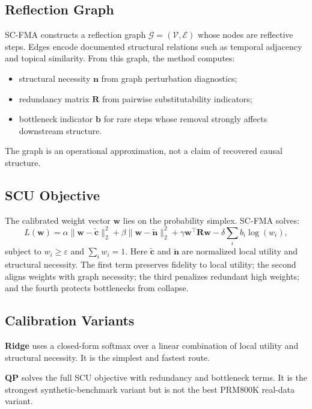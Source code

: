 \documentclass[a4paper,fleqn]{cas-sc}
\begin{document}
\subsection{Reflection Graph}

SC-FMA constructs a reflection graph $\mathcal{G}=(\mathcal{V},\mathcal{E})$ whose nodes are reflective steps. Edges encode documented structural relations such as temporal adjacency and topical similarity. From this graph, the method computes:
\begin{itemize}
\item structural necessity $\mathbf{n}$ from graph perturbation diagnostics;
\item redundancy matrix $\mathbf{R}$ from pairwise substitutability indicators;
\item bottleneck indicator $\mathbf{b}$ for rare steps whose removal strongly affects downstream structure.
\end{itemize}
The graph is an operational approximation, not a claim of recovered causal structure.

\subsection{SCU Objective}

The calibrated weight vector $\mathbf{w}$ lies on the probability simplex. SC-FMA solves:
\begin{equation}
L(\mathbf{w}) =
\alpha\|\mathbf{w}-\tilde{\mathbf{c}}\|_2^2
+ \beta\|\mathbf{w}-\tilde{\mathbf{n}}\|_2^2
+ \gamma\mathbf{w}^{\top}\mathbf{R}\mathbf{w}
- \delta\sum_i b_i\log(w_i),
\end{equation}
subject to $w_i\ge \varepsilon$ and $\sum_i w_i=1$. Here $\tilde{\mathbf{c}}$ and $\tilde{\mathbf{n}}$ are normalized local utility and structural necessity. The first term preserves fidelity to local utility; the second aligns weights with graph necessity; the third penalizes redundant high weights; and the fourth protects bottlenecks from collapse.

\subsection{Calibration Variants}

\textbf{Ridge} uses a closed-form softmax over a linear combination of local utility and structural necessity. It is the simplest and fastest route.

\textbf{QP} solves the full SCU objective with redundancy and bottleneck terms. It is the strongest synthetic-benchmark variant but is not the best PRM800K real-data variant.
\end{document}
